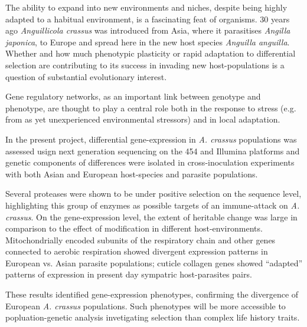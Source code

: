 


\begin{abstracts}        %

  The ability to expand into new environments and niches, despite
  being highly adapted to a habitual environment, is a fascinating
  feat of organisms. 30 years ago \textit{Anguillicola crassus} was
  introduced from Asia, where it parasitises \textit{Angilla
    japonica}, to Europe and spread here in the new host species
  \textit{Anguilla anguilla}. Whether and how much phenotypic
  plasticity or rapid adaptation to differential selection are
  contributing to its success in invading new host-populations is a
  question of substantial evolutionary interest.

  Gene regulatory networks, as an important link between genotype
  and phenotype, are thought to play a central role both in the
  response to stress (e.g. from as yet unexperienced environmental
  stressors) and in local adaptation.

  In the present project, differential gene-expression in
  \textit{A. crassus} populations was assessed usign next generation
  sequencing on the 454 and Illumina platforms and genetic components
  of differences were isolated in cross-inoculation experiments with
  both Asian and European host-species and parasite populations.

  Several proteases were shown to be under positive selection on the
  sequence level, highlighting this group of enzymes as possible
  targets of an immune-attack on \textit{A. crassus}. On the
  gene-expression level, the extent of heritable change was large in
  comparison to the effect of modification in different
  host-environments. Mitochondrially encoded subunits of the
  respiratory chain and other genes connected to aerobic respiration
  showed divergent expression patterns in European vs. Asian parasite
  populations; cuticle collagen genes showed ``adapted'' patterns of
  expression in present day sympatric host-parasites pairs.
  
  These results identified gene-expression phenotypes, confirming the
  divergence of European \textit{A. crassus} populations. Such
  phenotypes will be more accessible to popluation-genetic analysis
  invetigating selection than complex life history traits.
  

\end{abstracts}



     